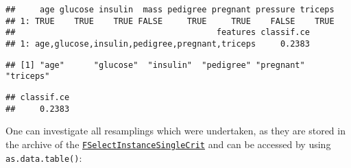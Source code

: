 \documentclass[
]{scrbook}
\newenvironment{Shaded}{\begin{snugshade}}{\end{snugshade}}
\newcommand{\CommentTok}[1]{\textcolor[rgb]{0.56,0.35,0.01}{\textit{#1}}}
\newcommand{\FunctionTok}[1]{\textcolor[rgb]{0.00,0.00,0.00}{#1}}
\newcommand{\NormalTok}[1]{#1}
\newcommand{\SpecialCharTok}[1]{\textcolor[rgb]{0.00,0.00,0.00}{#1}}
\newcommand{\StringTok}[1]{\textcolor[rgb]{0.31,0.60,0.02}{#1}}
\renewenvironment{Shaded} {\begin{snugshade}\small} {\end{snugshade}}
\begin{document}
\begin{Shaded}
\end{Shaded}

\begin{verbatim}
##     age glucose insulin  mass pedigree pregnant pressure triceps
## 1: TRUE    TRUE    TRUE FALSE     TRUE     TRUE    FALSE    TRUE
##                                         features classif.ce
## 1: age,glucose,insulin,pedigree,pregnant,triceps     0.2383
\end{verbatim}

\begin{Shaded}
\end{Shaded}

\begin{verbatim}
## [1] "age"      "glucose"  "insulin"  "pedigree" "pregnant" "triceps"
\end{verbatim}

\begin{Shaded}
\end{Shaded}

\begin{verbatim}
## classif.ce 
##     0.2383
\end{verbatim}

One can investigate all resamplings which were undertaken, as they are stored in the archive of the \href{https://mlr3fselect.mlr-org.com/reference/FSelectInstanceSingleCrit.html}{\texttt{FSelectInstanceSingleCrit}} and can be accessed by using \texttt{as.data.table()}:

\begin{Shaded}
\end{Shaded}
\end{document}

